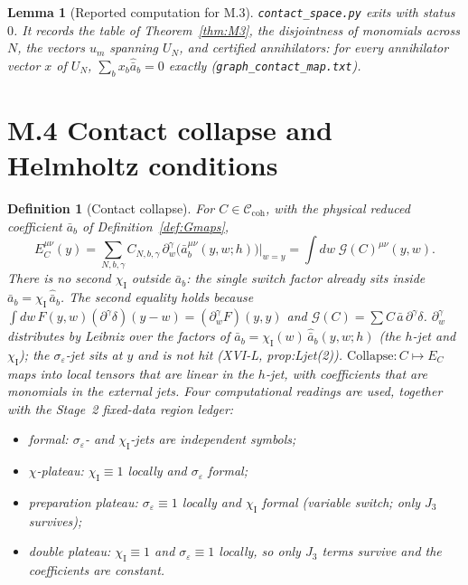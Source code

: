 \documentclass{article}
\newtheorem{lemma}[proposition]{Lemma}
\newtheorem{definition}[proposition]{Definition}
\theoremstyle{remark}
\newcommand{\sigeps}{\sigma_\varepsilon}
\newcommand{\chiI}{\chi_{\mathrm I}}
\newcommand{\Ccoh}{\mathcal C_{\mathrm{coh}}}
\newcommand{\Coll}{\mathrm{Collapse}}
\begin{document}
\begin{lemma}[Reported computation for M.3]
\label{lem:M3comp}
\texttt{contact\_space.py} exits with status $0$.
It records the table of Theorem~\ref{thm:M3}, the disjointness of monomials across $N$, the vectors $u_m$ spanning $U_N$, and certified annihilators: for every annihilator vector $x$ of $U_N$, $\sum_bx_b\hat{\bar a}_b=0$ exactly (\texttt{graph\_contact\_map.txt}).
\end{lemma}

\section{M.4 Contact collapse and Helmholtz conditions}
\label{sec:m4}

\begin{definition}[Contact collapse]
\label{def:collapse}
For $C\in\Ccoh$, with the physical reduced coefficient $\bar a_b$ of Definition~\ref{def:Gmaps},
\[
E_C^{\mu\nu}(y)=\sum_{N,b,\gamma}C_{N,b,\gamma}\,\partial_w^\gamma\bigl(\bar a_b^{\mu\nu}(y,w;h)\bigr)\Big|_{w=y}
=\int dw\;\mathcal G(C)^{\mu\nu}(y,w).
\]
There is no second $\chiI$ outside $\bar a_b$: the single switch factor already sits inside $\bar a_b=\chiI\,\hat{\bar a}_b$.
The second equality holds because $\int dw\,F(y,w)(\partial^\gamma\delta)(y-w)=(\partial_w^\gamma F)(y,y)$ and $\mathcal G(C)=\sum C\,\bar a\,\partial^\gamma\delta$.
$\partial_w^\gamma$ distributes by Leibniz over the factors of $\bar a_b=\chiI(w)\,\hat{\bar a}_b(y,w;h)$ (the $h$-jet and $\chiI$); the $\sigeps$-jet sits at $y$ and is not hit (XVI-L, prop:Ljet(2)).
$\Coll:C\mapsto E_C$ maps into local tensors that are linear in the $h$-jet, with coefficients that are monomials in the external jets.
Four computational readings are used, together with the Stage~2 fixed-data region ledger:
\begin{itemize}
\item \emph{formal}: $\sigeps$- and $\chiI$-jets are independent symbols;
\item \emph{$\chi$-plateau}: $\chiI\equiv1$ locally and $\sigeps$ formal;
\item \emph{preparation plateau}: $\sigeps\equiv1$ locally and $\chiI$ formal (variable switch; only $J_3$ survives);
\item \emph{double plateau}: $\chiI\equiv1$ and $\sigeps\equiv1$ locally, so only $J_3$ terms survive and the coefficients are constant.
\end{itemize}
\end{definition}
\end{document}
